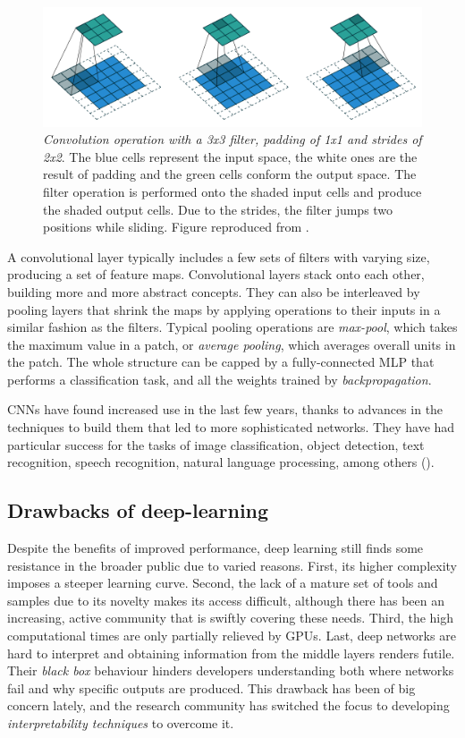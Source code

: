 \begin{figure}
	\centering
	\includegraphics[width=0.8\linewidth]{Figures/padding}
	\caption{\textit{Convolution operation with a 3x3 filter, padding of 1x1 and strides of 2x2}. The blue cells represent the input space, the white ones are the result of padding and the green cells conform the output space. The filter operation is performed onto the shaded input cells and produce the shaded output cells. Due to the strides, the filter jumps two positions while sliding. Figure reproduced from \cite{Dumoulin2016}.}
	\label{fig:padding}
\end{figure}

A convolutional layer typically includes a few sets of filters with varying size, producing a set of feature maps. Convolutional layers stack onto each other, building more and more abstract concepts. They can also be interleaved by pooling layers that shrink the maps by applying operations to their inputs in a similar fashion as the filters. Typical pooling operations are \textit{max-pool}, which takes the maximum value in a patch, or \textit{average pooling}, which averages overall units in the patch. The whole structure can be capped by a fully-connected MLP that performs a classification task, and all the weights trained by \textit{backpropagation}.

CNNs have found increased use in the last few years, thanks to advances in the techniques to build them that led to more sophisticated networks. They have had particular success for the tasks of image classification, object detection, text recognition, speech recognition, natural language processing, among others (\cite{Gu2017}).

\subsection{Drawbacks of deep-learning}
Despite the benefits of improved performance, deep learning still finds some resistance in the broader public due to varied reasons. First, its higher complexity imposes a steeper learning curve. Second, the lack of a mature set of tools and samples due to its novelty makes its access difficult, although there has been an increasing, active community that is swiftly covering these needs. Third, the high computational times are only partially relieved by GPUs. Last, deep networks are hard to interpret and obtaining information from the middle layers renders futile. Their \textit{black box} behaviour hinders developers understanding both where networks fail and why specific outputs are produced. This drawback has been of big concern lately, and the research community has switched the focus to developing \textit{interpretability techniques} to overcome it.


